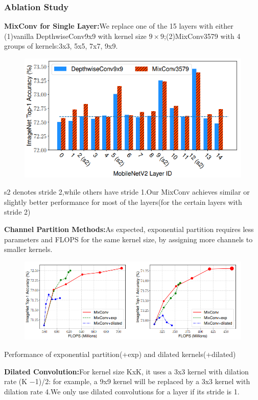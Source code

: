 \documentclass[11pt]{article}
\begin{document}
\subsubsection{Ablation Study}
\textbf{MixConv for Single Layer:}We replace one of the 15 layers with either (1)vanilla DepthwiseConv9x9 with kernel size $9\times 9$;(2)MixConv3579 with 4 groups of kernels:{3x3, 5x5, 7x7, 9x9}.
\begin{figure}[H]
	\centering
	\includegraphics[scale = 0.55]{56}
\end{figure}
s2 denotes stride 2,while others have stride 1.Our MixConv achieves similar or slightly better performance for most of the layers(for the certain layers with stride 2)

\textbf{Channel Partition Methods:}As expected, exponential partition requires less parameters and FLOPS for the same kernel size, by assigning more channels to smaller kernels.

\begin{figure}[H]
	\centering
	\includegraphics[scale = 0.55]{57}
\end{figure}
Performance of exponential partition(+exp) and dilated kernels(+dilated)

\textbf{Dilated Convolution:}For kernel size KxK, it uses a 3x3 kernel with dilation rate
(K −1)/2: for example, a 9x9 kernel will be replaced by a 3x3 kernel with dilation rate 4.We only use dilated convolutions for a layer if its stride is 1.
\end{document}
